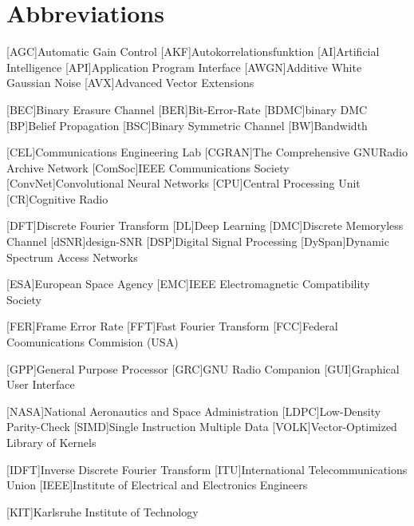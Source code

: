 \chapter{Abbreviations}
\begin{acronym}[TROLL]
  [AGC]{Automatic Gain Control}
  [AKF]{Autokorrelationsfunktion}
  [AI]{Artificial Intelligence}
  [API]{Application Program Interface}
  [AWGN]{Additive White Gaussian Noise}
  [AVX]{Advanced Vector Extensions}

  [BEC]{Binary Erasure Channel}
  [BER]{Bit-Error-Rate}
  [BDMC]{binary \acs{DMC}}
  [BP]{Belief Propagation}
  [BSC]{Binary Symmetric Channel}
  [BW]{Bandwidth}

  [CEL]{Communications Engineering Lab}
  [CGRAN]{The Comprehensive GNURadio Archive Network}
  [ComSoc]{IEEE Communications Society}
  [ConvNet]{Convolutional Neural Networks}
  [CPU]{Central Processing Unit}
  [CR]{Cognitive Radio}

  [DFT]{Discrete Fourier Transform}
  [DL]{Deep Learning}
  [DMC]{Discrete Memoryless Channel}
  [dSNR]{design-\ac{SNR}}
  [DSP]{Digital Signal Processing}
  [DySpan]{Dynamic Spectrum Access Networks}

  [ESA]{European Space Agency}
  [EMC]{IEEE Electromagnetic Compatibility Society}

  [FER]{Frame Error Rate}
  [FFT]{Fast Fourier Transform}
  [FCC]{Federal Coomunications Commision (USA)}

  [GPP]{General Purpose Processor}
  [GRC]{GNU Radio Companion}
  [GUI]{Graphical User Interface}

  [NASA]{National Aeronautics and Space Administration}
  [LDPC]{Low-Density Parity-Check}
  [SIMD]{Single Instruction Multiple Data}
  [VOLK]{Vector-Optimized Library of Kernels}

  [IDFT]{Inverse Discrete Fourier Transform}
  [ITU]{International Telecommunications Union}
  [IEEE]{Institute of Electrical and Electronics Engineers}

  [KIT]{Karlsruhe Institute of Technology}


\end{acronym}
